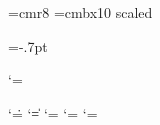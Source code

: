 
\font\eightrm=cmr8
\font\elevenbf=cmbx10 scaled \magstephalf

\def\ttstrut{\relax\logicstrut\truthtablerowheight\truthtablerowdepth}
\def\ttfirstlinestrut{{\advance\truthtablerowdepth by\truthtablefirstrowdepthadjust\ttstrut}}

\newdimen\tthalfinteritemspace
\def\settthalfinteritemspace{\tthalfinteritemspace=.5\truthtableinteritemspace}

\newif\ifttfirstrow
\def\ttvrule{{%
	\vrule width\truthtablelinethickness%
	\ifttfirstrow\ttfirstlinestrut\else\ttstrut\fi%
}}

\def\makettcellmath{\def\ttcell{${}}}
\def\makettcellvalues{\global\def\ttcell{\eightrm\makeasteriskttValue}}

\newdimen\ttValueshift \ttValueshift=-.7pt
\let\ttValuefont=\elevenbf


\def\ttValue{\afterassignment\ttValueA\let\next=}
\def\ttValueA{\expandafter\ttValueB\next}
\def\ttValueB#1{%
	\ifx#1\relax\else%
		\raise\ttValueshift\hbox{\ttValuefont#1}%
	\fi%
}

\begingroup
\catcode`\*=\active
\gdef\makeasteriskttValue{%
	\catcode`\*=\active%
	\let*\ttValue\relax%
}
\endgroup

\def\truthtableline{%
	\ifmmode$\fi\cr\noalign{%
		\hrule height\truthtablelinethickness%
		\global\ttfirstrowfalse%
		\makettcellvalues%
	}%
}



\newtoks\everytruthtable \everytruthtable{\relax}
\newtoks\everyendtruthtable \everyendtruthtable{\relax}

\begingroup
\catcode`\.=\active%
\catcode`\|=\active
\catcode`\:=\active
\catcode`\T=\active
\catcode`\F=\active
\gdef\truthtable{\ensureline\vtop\bgroup\the\everytruthtable
	\ifx\endquantifiers\undefined \else\endquantifiers \fi%
	\catcode`\.=\active%
	\catcode`\|=\active%
	\catcode`\:=\active
	\def\endcell{{}\ifmmode$\fi&}
	\def.{\relax\endcell\relax}%
	\def|{.\endcell\omit\ttvrule..}
	\def:{.\endcell\omit\ttvrule\thinspace\ttvrule..}
	\offinterlineskip
	\ttfirstrowtrue
	\tabskip=\truthtableinteritemspace
	\settthalfinteritemspace
	\makettcellmath
	\ignoreallspaces
	\def\par{\endcell\omit\hskip-\tthalfinteritemspace\cr{}}
	\obeylines%
	\halign\bgroup%
		\hskip\tthalfinteritemspace\hfil\ttcell##\hfil&&%
		\hfil\ttcell##{}\hfil\ttstrut\cr%
		\makereturnsspaces
}%
\endgroup%

